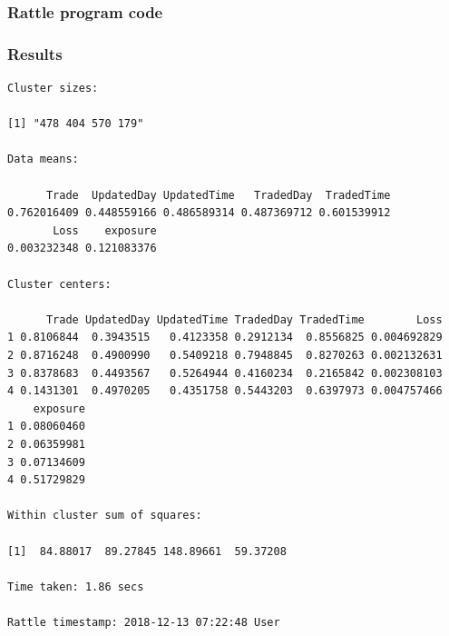 \documentclass[]{DissertateUSU}
\begin{document}
\subsubsection{Rattle program code}

\subsubsection{Results}\begin{verbatim}
Cluster sizes:

[1] "478 404 570 179"

Data means:

      Trade  UpdatedDay UpdatedTime   TradedDay  TradedTime 
0.762016409 0.448559166 0.486589314 0.487369712 0.601539912 
       Loss    exposure 
0.003232348 0.121083376 

Cluster centers:

      Trade UpdatedDay UpdatedTime TradedDay TradedTime        Loss
1 0.8106844  0.3943515   0.4123358 0.2912134  0.8556825 0.004692829
2 0.8716248  0.4900990   0.5409218 0.7948845  0.8270263 0.002132631
3 0.8378683  0.4493567   0.5264944 0.4160234  0.2165842 0.002308103
4 0.1431301  0.4970205   0.4351758 0.5443203  0.6397973 0.004757466
    exposure
1 0.08060460
2 0.06359981
3 0.07134609
4 0.51729829

Within cluster sum of squares:

[1]  84.88017  89.27845 148.89661  59.37208

Time taken: 1.86 secs

Rattle timestamp: 2018-12-13 07:22:48 User
\end{verbatim}
\end{document}
